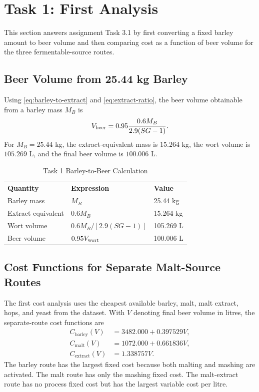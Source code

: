 \section{Task 1: First Analysis}
\label{sec:task1}
This section answers assignment Task 3.1 by first converting a fixed barley amount to beer volume and then comparing cost as a function of beer volume for the three fermentable-source routes.

\subsection{Beer Volume from 25.44 kg Barley}
\label{sec:task1-barley-volume}
Using \eqref{eq:barley-to-extract} and \eqref{eq:extract-ratio}, the beer volume obtainable from a barley mass $M_B$ is
\begin{equation}
  V_{\mathrm{beer}}
  =0.95\frac{0.6M_B}{2.9(SG-1)}.
  \label{eq:beer-from-barley-task31}
\end{equation}
For $M_B=25.44$ kg, the extract-equivalent mass is $15.264$ kg, the wort volume is $105.269$ L, and the final beer volume is $100.006$ L.

\begin{table}[H]
\renewcommand{\arraystretch}{1.15}
\caption{Task 1 Barley-to-Beer Calculation}
\label{tab:task31-barley}
\centering
\small
\begin{tabular}{@{}lll@{}}
\toprule
Quantity & Expression & Value \\
\midrule
Barley mass & $M_B$ & 25.44 kg \\
Extract equivalent & $0.6M_B$ & 15.264 kg \\
Wort volume & $0.6M_B/[2.9(SG-1)]$ & 105.269 L \\
Beer volume & $0.95V_{\mathrm{wort}}$ & 100.006 L \\
\bottomrule
\end{tabular}
\end{table}

\subsection{Cost Functions for Separate Malt-Source Routes}
\label{sec:task1-cost-functions}
The first cost analysis uses the cheapest available barley, malt, malt extract, hops, and yeast from the dataset. With $V$ denoting final beer volume in litres, the separate-route cost functions are
\begin{align}
  C_{\mathrm{barley}}(V) &= 3482.000 + 0.397529V,\\
  C_{\mathrm{malt}}(V) &= 1072.000 + 0.661836V,\\
  C_{\mathrm{extract}}(V) &= 1.338757V.
\end{align}
The barley route has the largest fixed cost because both malting and mashing are activated. The malt route has only the mashing fixed cost. The malt-extract route has no process fixed cost but has the largest variable cost per litre.

